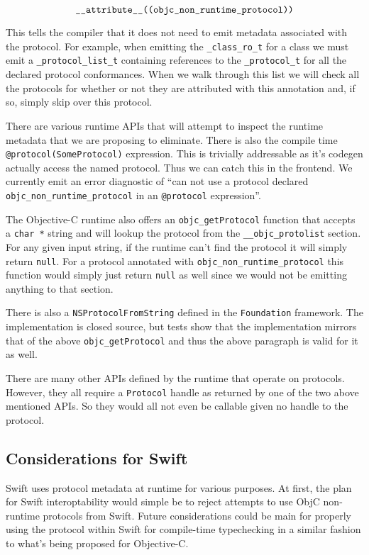 \documentclass{article}
\begin{document}
\[ \verb|__attribute__((objc_non_runtime_protocol))| \]

This tells the compiler that it does not need to emit metadata associated with
the protocol. For example, when emitting the \verb|_class_ro_t| for a class we
must emit a \verb|_protocol_list_t| containing references to the
\verb|_protocol_t| for all the declared protocol conformances. When we walk
through this list we will check all the protocols for whether or not they are
attributed with this annotation and, if so, simply skip over this protocol.

There are various runtime APIs that will attempt to inspect the runtime metadata
that we are proposing to eliminate. There is also the compile time \linebreak
\verb|@protocol(SomeProtocol)| expression. This is trivially addressable as it's
codegen actually access the named protocol. Thus we can catch this in the
frontend. We currently emit an error diagnostic of ``can not use a protocol
declared \verb|objc_non_runtime_protocol| in an \verb|@protocol| expression''.

The Objective-C runtime also offers an \verb|objc_getProtocol| function that
accepts a \verb|char *| string and will lookup the protocol from the
\verb|__objc_protolist| section. For any given input string, if the
runtime can't find the protocol it will simply return \verb|null|. For a protocol
annotated with \verb|objc_non_runtime_protocol| this function would simply just
return \verb|null| as well since we would not be emitting anything to that
section.

There is also a \verb|NSProtocolFromString| defined in the \verb|Foundation|
framework. The implementation is closed source, but tests show that the
implementation mirrors that of the above \verb|objc_getProtocol| and thus the
above paragraph is valid for it as well.

There are many other APIs defined by the runtime that operate on protocols.
However, they all require a \verb|Protocol| handle as returned by one of the two
above mentioned APIs. So they would all not even be callable given no handle to
the protocol.

\subsection{Considerations for Swift}

Swift uses protocol metadata at runtime for various purposes. At first, the plan
for Swift interoptability would simple be to reject attempts to use ObjC
non-runtime protocols from Swift. Future considerations could be main for
properly using the protocol within Swift for compile-time typechecking in a
similar fashion to what's being proposed for Objective-C.
\end{document}
